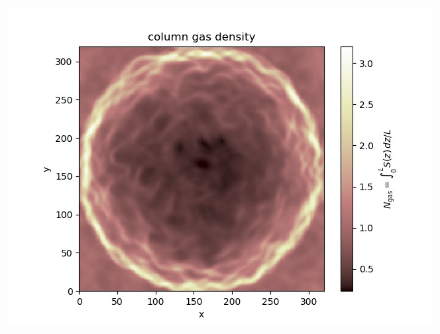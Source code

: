 \documentclass[fleqn,usenatbib]{mnras}
\begin{document}
\begin{figure}
{      \includegraphics{3Dsedov_SN_dust_newsetup2_10pc_chi4_320_FGupd_uin2_column_gasVAR60.jpg}}

  \caption{\label{3Dsedov} }
  \end{figure}  
\end{document}
